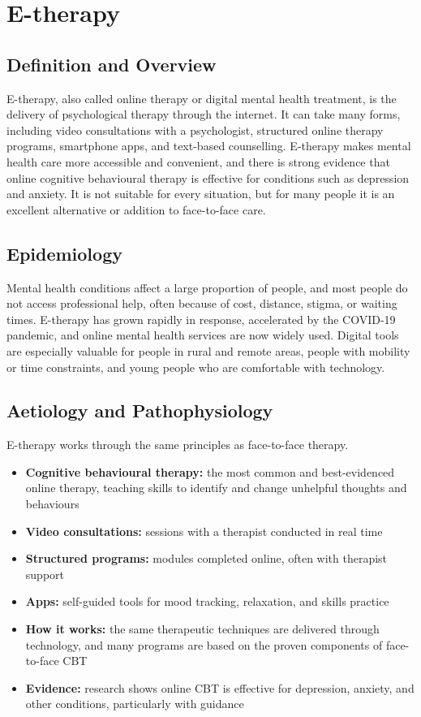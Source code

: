 \chapter{E-therapy}

\section*{Definition and Overview}
E-therapy, also called online therapy or digital mental health treatment, is the delivery of psychological therapy through the internet. It can take many forms, including video consultations with a psychologist, structured online therapy programs, smartphone apps, and text-based counselling. E-therapy makes mental health care more accessible and convenient, and there is strong evidence that online cognitive behavioural therapy is effective for conditions such as depression and anxiety. It is not suitable for every situation, but for many people it is an excellent alternative or addition to face-to-face care.

\section*{Epidemiology}
Mental health conditions affect a large proportion of people, and most people do not access professional help, often because of cost, distance, stigma, or waiting times. E-therapy has grown rapidly in response, accelerated by the COVID-19 pandemic, and online mental health services are now widely used. Digital tools are especially valuable for people in rural and remote areas, people with mobility or time constraints, and young people who are comfortable with technology.

\section*{Aetiology and Pathophysiology}
E-therapy works through the same principles as face-to-face therapy.
\begin{itemize}
    \item \textbf{Cognitive behavioural therapy:} the most common and best-evidenced online therapy, teaching skills to identify and change unhelpful thoughts and behaviours
    \item \textbf{Video consultations:} sessions with a therapist conducted in real time
    \item \textbf{Structured programs:} modules completed online, often with therapist support
    \item \textbf{Apps:} self-guided tools for mood tracking, relaxation, and skills practice
    \item \textbf{How it works:} the same therapeutic techniques are delivered through technology, and many programs are based on the proven components of face-to-face CBT
    \item \textbf{Evidence:} research shows online CBT is effective for depression, anxiety, and other conditions, particularly with guidance
\end{itemize}

